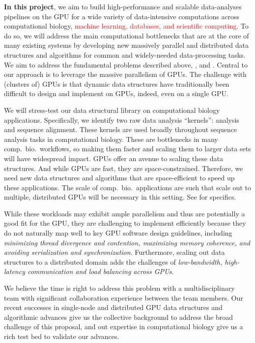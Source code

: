 %

\textbf{In this project}, we aim to build high-performance and scalable
data-analyses pipelines on the GPU for a wide variety of data-intensive
computations across computational biology, \textcolor{red}{machine learning, databases, and
scientific computing}.  To do so, we will address the main computational
bottlenecks that are at the core of many existing systems by developing new
massively parallel and distributed data structures and algorithms for common
and widely-needed data-processing tasks. We aim to address the fundamental
problems described above, , and .    
%
Central to our approach is to leverage the massive parallelism of GPUs. The
challenge with (clusters of) GPUs  is that dynamic data structures have
traditionally  been difficult to design and implement on GPUs, indeed, even on
a single GPU\@. 

We will stress-test our data structural library on computational biology
applications. Specifically, we identify two raw data analysis ``kernels'':
\Kmer analysis and sequence alignment. These kernels are used broadly
throughout sequence analysis tasks in computational biology. These are bottlenecks in many
comp.~bio.~workflows, so making them faster and scaling them to larger data
sets will have widespread impact. GPUs offer an avenue to scaling these data
structures. And while GPUs are fast, they are space-constrained.  Therefore,
we need new data structures and algorithms that are space-efficient to speed up
these applications. The scale of comp.~bio.~applications are such that scale
out to multiple, distributed GPUs will be necessary in this setting. See
 for specifics.  

 While these workloads may exhibit ample parallelism and thus are potentially a
good fit for the GPU, they are challenging to implement efficiently because
they do not naturally map well to key GPU software design guidelines, including
\emph{minimizing thread divergence and contention, maximizing memory coherence,
and avoiding serialization and synchronization}. Furthermore, scaling out data
structures to a distributed domain adds the challenges of \emph{low-bandwidth,
high-latency communication and load balancing across GPUs}.

 We believe the time is right to address this problem with a multidisciplinary
team with significant collaboration experience between the team members. Our
recent successes in single-node and distributed GPU data structures and
algorithmic advances give us the
collective background to address the broad challenge of this proposal, and out expertise in computational biology give us a rich test bed to validate our advances.


